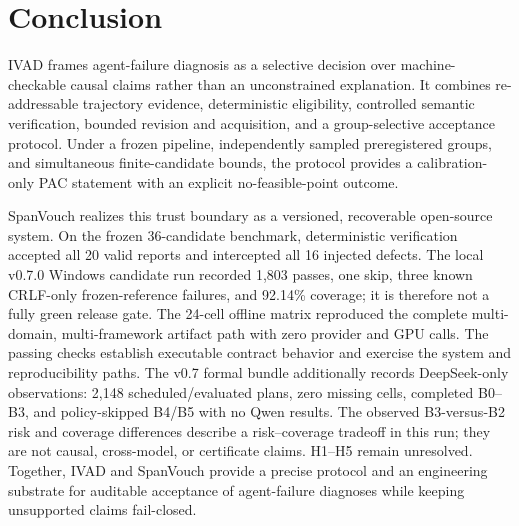 \section{Conclusion}
\label{sec:conclusion}

IVAD frames agent-failure diagnosis as a selective decision over
machine-checkable causal claims rather than an unconstrained explanation. It
combines re-addressable trajectory evidence, deterministic eligibility,
controlled semantic verification, bounded revision and acquisition, and a
group-selective acceptance protocol. Under a frozen pipeline, independently
sampled preregistered groups, and simultaneous finite-candidate bounds, the
protocol provides a calibration-only PAC statement with an explicit
no-feasible-point outcome.

SpanVouch realizes this trust boundary as a versioned, recoverable open-source
system. On the frozen 36-candidate benchmark, deterministic verification
accepted all 20 valid reports and intercepted all 16 injected defects. The
local v0.7.0 Windows candidate run recorded 1,803 passes, one skip, three known
CRLF-only frozen-reference failures, and 92.14\% coverage; it is therefore not
a fully green release gate. The 24-cell offline matrix reproduced the complete
multi-domain, multi-framework artifact path with zero provider and GPU calls.
The passing checks establish executable contract behavior and exercise the
system and reproducibility paths. The v0.7 formal bundle additionally records
DeepSeek-only observations: 2,148 scheduled/evaluated plans, zero missing cells,
completed B0--B3, and policy-skipped B4/B5 with no Qwen results. The observed B3-versus-B2
risk and coverage differences describe a risk--coverage tradeoff in this run;
they are not causal, cross-model, or certificate claims. H1--H5 remain
unresolved. Together, IVAD and SpanVouch provide a precise protocol and an
engineering substrate for auditable acceptance of agent-failure diagnoses while
keeping unsupported claims fail-closed.

